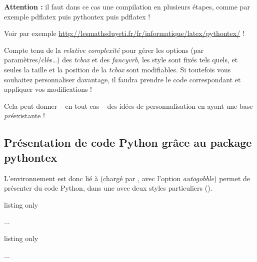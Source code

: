 \begin{warningblock}
\textbf{Attention : }il faut dans ce cas une compilation en plusieurs étapes, comme par exemple \textsf{pdflatex puis pythontex puis pdflatex} !

Voir par exemple \url{http://lesmathsduyeti.fr/fr/informatique/latex/pythontex/} !
\end{warningblock}

\begin{noteblock}
Compte tenu de la \textit{relative complexité} pour gérer les options (par paramètres/clés\ldots) des \textit{tcbox} et des \textit{fancyvrb}, les style sont \og fixés \fg{} tels quels, et seules la taille et la position de la \textit{tcbox} sont modifiables. Si toutefois vous souhaitez personnaliser davantage, il faudra prendre le code correspondant et appliquer vos modifications !

Cela peut donner -- en tout cas -- des idées de personnalisation en ayant une base \textit{pré}existante !
\end{noteblock}

\subsection{Présentation de code Python grâce au package pythontex}\label{pythontex}

\begin{tipblock}
L'environnement  est donc lié à  (chargé par , avec l'option \textit{autogobble}) permet de présenter du code \textsf{Python}, dans une  avec deux styles particuliers ().
\end{tipblock}

\begin{PresCodeTexPL}{listing only}
\begin{CodePythontex}[clés]{} %
...
\end{CodePythontex}
\end{PresCodeTexPL}

\begin{PresCodeTexPL}{listing only}
\begin{CodePythontexAlt}[clés]{} %
	...
\end{CodePythontexAlt}
\end{PresCodeTexPL}

